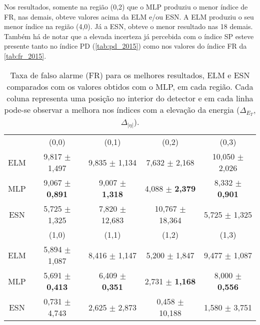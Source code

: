 Nos resultados, somente na região (0,2) que o MLP produziu o menor índice de FR, nas demais, obteve valores acima da ELM e/ou ESN. A ELM produziu o seu menor índice na região (4,0). Já a ESN, obteve o menor resultado nas 18 demais. Também há de notar que a elevada incerteza já percebida com o índice SP esteve presente tanto no índice PD (\autoref{tab:pd_2015}) como nos valores do índice FR da \autoref{tab:fr_2015}.

\begin{table}[H]
	\centering
	\caption{Taxa de falso alarme (FR) para os melhores resultados, ELM e ESN comparados com os valores obtidos com o MLP, em cada região. Cada coluna representa uma posição no interior do detector e em cada linha pode-se observar a melhora nos índices com a elevação da energia ($\Delta_{E_T}$, $\Delta_{|\eta|}$).}
	\label{tab:fr_2015}
	\begin{footnotesize}
		\setlength{\extrarowheight}{1pt}       %
		\begin{tabular}{c*{4}c} \toprule
			    &        (0,0)      &       (0,1)        &       (0,2)         &      (0,3)         \\ \cmidrule(lr){2-2}\cmidrule(lr){3-3}\cmidrule(lr){4-4}\cmidrule(lr){5-5}
			ELM & 9,817 $\pm$ 1,497 & 9,835 $\pm$  1,134 &  7,632 $\pm$  2,168 & 10,050 $\pm$ 2,026 \\
			MLP & 9,067 $\pm$ \textbf{0,891} & 9,007 $\pm$ \textbf{ 1,318} & \cellcolor{gray!15}4,088 $\pm$  \textbf{2,379} &  8,332 $\pm$ \textbf{0,901} \\
			ESN & 5,725 $\pm$ 1,325 & 7,820 $\pm$ 12,683 & 10,767 $\pm$ 18,364 &  5,725 $\pm$ 1,325 \\\midrule \midrule
		 	    &        (1,0)      &       (1,1)        &        (1,2)        &       (1,3)        \\\cmidrule(lr){2-2}\cmidrule(lr){3-3}\cmidrule(lr){4-4}\cmidrule(lr){5-5}                             
			ELM & 5,894 $\pm$ 1,087 & 8,416 $\pm$ 1,147 & 5,200 $\pm$  1,847 & 9,477 $\pm$ 1,087 \\
			MLP & 5,691 $\pm$ \textbf{0,413} & 6,409 $\pm$ \textbf{0,351} & 2,731 $\pm$  \textbf{1,168} & 8,000 $\pm$ \textbf{0,556} \\
			ESN & 0,731 $\pm$ 4,743 & 2,625 $\pm$ 2,873 & 0,458 $\pm$ 10,188 & 1,580 $\pm$ 3,751 \\\midrule \midrule

\end{tabular}
\end{footnotesize}
\end{table}
